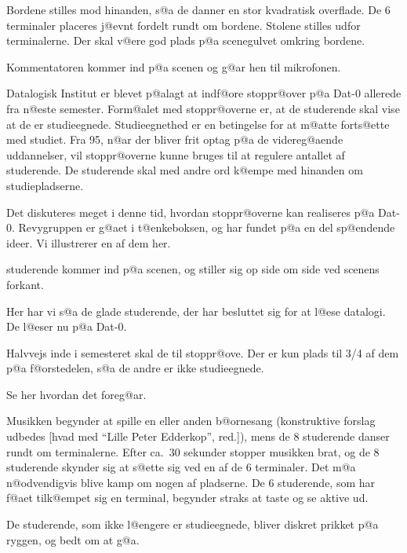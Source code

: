 \documentclass[a4paper,11pt]{article}
\begin{document}
\begin{sketch}

\scene
Bordene stilles mod hinanden, s@a de danner en stor kvadratisk
overflade. De 6 terminaler placeres j@evnt fordelt rundt om
bordene. Stolene stilles udfor terminalerne. Der skal v@ere god
plads p@a scenegulvet omkring bordene.

Kommentatoren kommer ind p@a scenen og g@ar hen til mikrofonen.

 Datalogisk Institut er blevet p@alagt at indf@ore
             stoppr@over p@a Dat-0 allerede fra n@este semester.
             Form@alet med stoppr@overne er, at de studerende
             skal vise at de er studieegnede. Studieegnethed
             er en betingelse for at m@atte forts@ette med studiet.
             Fra 95, n@ar der bliver frit optag p@a de videreg@aende
             uddannelser, vil stoppr@overne kunne bruges til at
             regulere antallet af studerende. De studerende skal
             med andre ord k@empe med hinanden om studiepladserne.

             Det diskuteres meget i denne tid, hvordan stoppr@overne kan realiseres p@a Dat-0. Revygruppen er g@aet
             i t@enkeboksen, og har fundet p@a en del sp@endende
             ideer. Vi illustrerer en af dem her.

 studerende kommer ind p@a scenen, og stiller sig op side om side
ved scenens forkant.

 Her har vi s@a de glade studerende, der har besluttet
             sig for at l@ese datalogi. De l@eser nu p@a Dat-0.

             Halvvejs inde i semesteret skal de til stoppr@ove.
             Der er kun plads til 3/4 af dem p@a f@orstedelen, s@a de
             andre er ikke studieegnede.

             Se her hvordan det foreg@ar.

\scene Musikken begynder at spille en eller anden b@ornesang
(konstruktive forslag udbedes [hvad med ``Lille Peter Edderkop'',
red.]), mens de 8 studerende danser rundt om terminalerne. Efter ca.\
30 sekunder stopper musikken brat, og de 8 studerende skynder sig at
s@ette sig ved en af de 6 terminaler. Det m@a n@odvendigvis blive kamp
om nogen af pladserne. De 6 studerende, som har f@aet tilk@empet sig
en terminal, begynder straks at taste og se aktive ud.

 De studerende, som ikke l@engere er studieegnede,
             bliver diskret prikket p@a ryggen, og bedt om at g@a.


\end{sketch}
\end{document}
